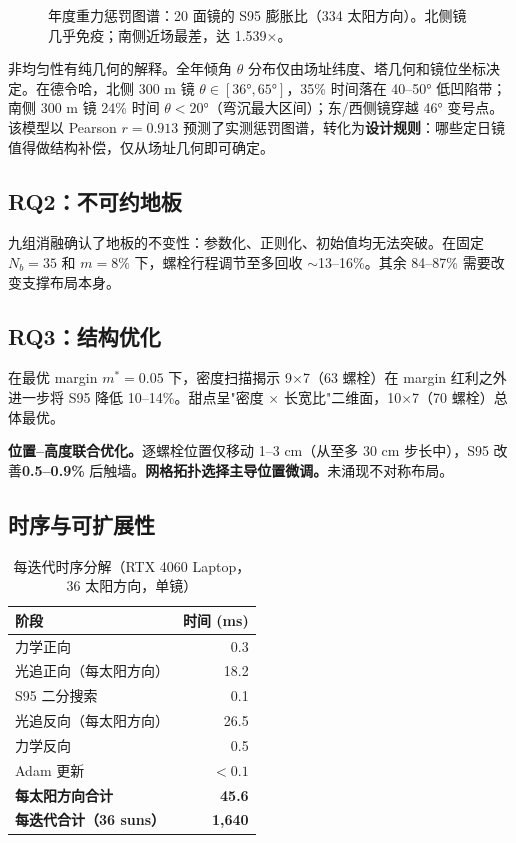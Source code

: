 \documentclass[12pt,a4paper]{ctexart}
\begin{document}
\begin{figure}[t]
\centering
\caption{年度重力惩罚图谱：20 面镜的 S95 膨胀比（334 太阳方向）。北侧镜几乎免疫；南侧近场最差，达 1.539$\times$。}
\label{fig:penalty}
\end{figure}

非均匀性有纯几何的解释。全年倾角 $\theta$ 分布仅由场址纬度、塔几何和镜位坐标决定。在德令哈，北侧 300 m 镜 $\theta \in [36\si{\degree}, 65\si{\degree}]$，35\% 时间落在 40--50° 低凹陷带；南侧 300 m 镜 24\% 时间 $\theta < 20\si{\degree}$（弯沉最大区间）；东/西侧镜穿越 46° 变号点。该模型以 Pearson $r = 0.913$ 预测了实测惩罚图谱，转化为\textbf{设计规则}：哪些定日镜值得做结构补偿，仅从场址几何即可确定。

\subsection{RQ2：不可约地板}

九组消融确认了地板的不变性：参数化、正则化、初始值均无法突破。在固定 $N_b = 35$ 和 $m = 8\%$ 下，螺栓行程调节至多回收 $\sim$13--16\%。其余 84--87\% 需要改变支撑布局本身。

\subsection{RQ3：结构优化}

在最优 margin $m^*{=}0.05$ 下，密度扫描揭示 9$\times$7（63 螺栓）在 margin 红利之外进一步将 S95 降低 10--14\%。甜点呈"密度 $\times$ 长宽比"二维面，10$\times$7（70 螺栓）总体最优。

\textbf{位置--高度联合优化。}逐螺栓位置仅移动 1--3 cm（从至多 30 cm 步长中），S95 改善\textbf{0.5--0.9\%} 后触墙。\textbf{网格拓扑选择主导位置微调。}未涌现不对称布局。

\subsection{时序与可扩展性}

\begin{table}[t]
\centering
\caption{每迭代时序分解（RTX 4060 Laptop，36 太阳方向，单镜）}
\label{tab:timing}
\small
\begin{tabular}{lr}
\toprule
阶段 & 时间 (ms) \\
\midrule
力学正向 & 0.3 \\
光追正向（每太阳方向） & 18.2 \\
S95 二分搜索 & 0.1 \\
光追反向（每太阳方向） & 26.5 \\
力学反向 & 0.5 \\
Adam 更新 & $<0.1$ \\
\midrule
\textbf{每太阳方向合计} & \textbf{45.6} \\
\textbf{每迭代合计（36 suns）} & \textbf{1,640} \\
\bottomrule
\end{tabular}
\end{table}
\end{document}
